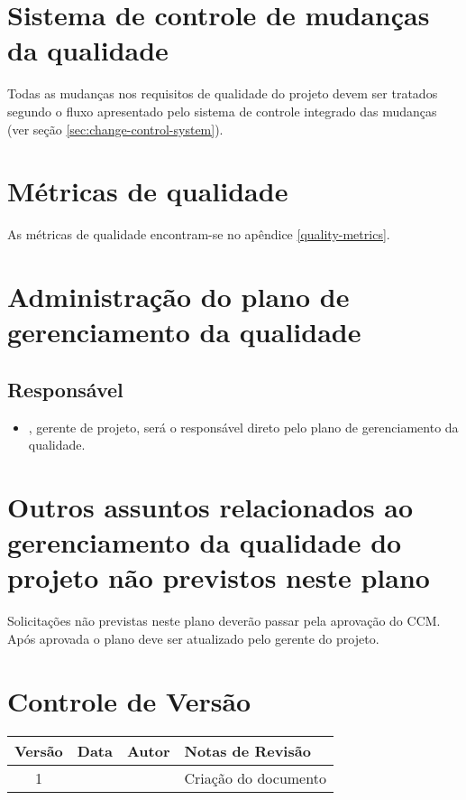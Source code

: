 \section{Sistema de controle de mudanças da qualidade}

Todas as mudanças nos requisitos de qualidade do projeto devem ser tratados segundo o fluxo apresentado pelo sistema de controle integrado das mudanças (ver seção \ref{sec:change-control-system}).

\section{Métricas de qualidade}

As métricas de qualidade encontram-se no apêndice \ref{quality-metrics}.

\section{Administração do plano de gerenciamento da qualidade}

\subsection{Responsável}

\begin{itemize}
	\item \projectManagerName, gerente de projeto, será o responsável direto pelo plano de gerenciamento da qualidade.
\end{itemize}

\section{Outros assuntos relacionados ao gerenciamento da qualidade do projeto não previstos neste plano}

Solicitações não previstas neste plano deverão passar pela aprovação do CCM. Após aprovada o plano deve ser atualizado pelo gerente do projeto.

\section{Controle de Versão}

\begin{table}[H]
	\begin{tabularx}{\textwidth}{| c | c | X | X |}
		\hline
		\textbf{Versão} & \textbf{Data} & \textbf{Autor}      & \textbf{Notas de Revisão} \\
		\hline
		1                &               & \projectManagerName & Criação do documento     \\
		\hline
	\end{tabularx}
	\centering
\end{table}

